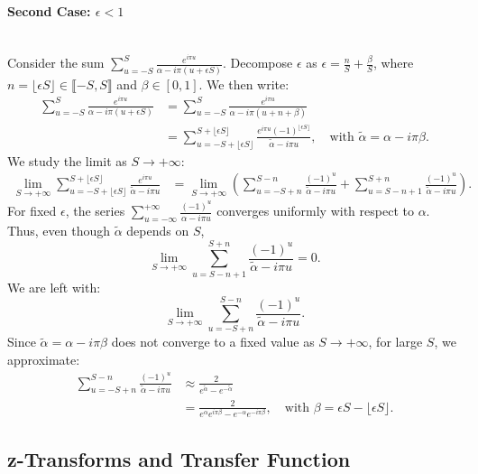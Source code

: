 \paragraph{Second Case: $\epsilon < 1$} \\
Consider the sum $\sum_{u=-S}^S \frac{e^{i\pi u}}{\alpha - i\pi(u + \epsilon S)}$. Decompose $\epsilon$ as $\epsilon = \frac{n}{S} + \frac{\beta}{S}$, where $n = \lfloor \epsilon S \rfloor \in \llbracket -S, S \rrbracket$ and $\beta \in [0,1]$. We then write:
\begin{align*}
    \sum_{u=-S}^S \frac{e^{i\pi u}}{\alpha - i\pi(u + \epsilon S)} 
    &= \sum_{u=-S}^S \frac{e^{i\pi u}}{\alpha - i\pi(u + n + \beta)} \\
    &= \sum_{u=-S+\lfloor \epsilon S \rfloor}^{S+\lfloor \epsilon S \rfloor} \frac{e^{i\pi u}(-1)^{\lfloor \epsilon S \rfloor}}{\tilde{\alpha} - i\pi u}, \quad \text{with } \tilde{\alpha} = \alpha - i\pi \beta.
\end{align*}
We study the limit as $S \to +\infty$:
\begin{align*}
    \lim_{S \to +\infty} \sum_{u=-S+\lfloor \epsilon S \rfloor}^{S+\lfloor \epsilon S \rfloor} \frac{e^{i\pi u}}{\tilde{\alpha} - i\pi u}
    &= \lim_{S \to +\infty} \left( \sum_{u=-S+n}^{S-n} \frac{(-1)^u}{\tilde{\alpha} - i\pi u} + \sum_{u=S-n+1}^{S+n} \frac{(-1)^u}{\tilde{\alpha} - i\pi u} \right).
\end{align*}
For fixed $\epsilon$, the series $\sum_{u=-\infty}^{+\infty} \frac{(-1)^u}{\alpha - i\pi u}$ converges uniformly with respect to $\alpha$. Thus, even though $\tilde{\alpha}$ depends on $S$, 
\[
\lim_{S \to +\infty} \sum_{u=S-n+1}^{S+n} \frac{(-1)^u}{\tilde{\alpha} - i\pi u} = 0.
\]
We are left with:
\[
\lim_{S \to +\infty} \sum_{u=-S+n}^{S-n} \frac{(-1)^u}{\tilde{\alpha} - i\pi u}.
\]
Since $\tilde{\alpha} = \alpha - i\pi \beta$ does not converge to a fixed value as $S \to +\infty$, for large $S$, we approximate:
\begin{align*}
    \sum_{u=-S+n}^{S-n} \frac{(-1)^u}{\tilde{\alpha} - i\pi u} &\approx \frac{2}{e^{\tilde{\alpha}} - e^{-\tilde{\alpha}}} \\
    &= \frac{2}{e^{\alpha}e^{i\pi \beta} - e^{-\alpha}e^{-i\pi \beta}}, \quad \text{with } \beta = \epsilon S - \lfloor \epsilon S \rfloor.
\end{align*}



\subsection{z-Transforms and Transfer Function}

